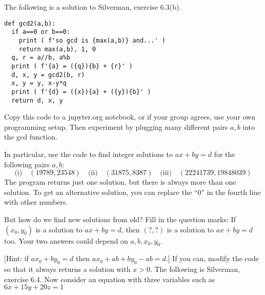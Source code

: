 \documentclass[12pt]{exam}
\begin{document}
\begin{questions}
  \question The following is a solution to Silverman, exercise 6.3(b).
  \begin{lstlisting}
def gcd2(a,b):
  if a==0 or b==0:
    print ( f'so gcd is {max(a,b)} and...' )
    return max(a,b), 1, 0
  q, r = a//b, a%b
  print ( f'{a} = ({q}){b} + {r}' )
  d, x, y = gcd2(b, r)
  x, y = y, x-y*q
  print ( f'{d} = ({x}){a} + ({y}){b}' )
  return d, x, y
  \end{lstlisting}
  Copy this code to a jupyter.org notebook, or if your group agrees, use your own programming setup. Then experiment by plugging many different pairs $a,b$ into the gcd function.

  In particular, use the code to find integer solutions to $ax+by=d$ for the following pairs $a,b$:
  \[\text{(i)}\quad(19789, 23548)\quad
  \text{(ii)}\quad(31875, 8387)\quad
  \text{(iii)}\quad(22241739, 19848039)
    \]
  \vspace{.75in}
  \question The program returns just one solution, but there is always more than one solution. To get an alternative solution, you can replace the ``$0$'' in the fourth line with other numbers.
  
   But how do we find new solutions from old? Fill in the question marks: If $(x_0,y_0)$ is a solution to $ax+by=d$, then $(?,?)$ is a solution to $ax+by=d$ too. Your two answers could depend on $a,b,x_0,y_0$.

  [Hint: if $ax_0+by_0=d$ then $ax_0+ab+by_0-ab=d$.]
  \vspace{\fill}
  \question If you can, modify the code so that it always returns a solution with $x>0$.
  \newpage
  \question The following is Silverman, exercise 6.4. Now consider an equation with three variables such as $6x+15y+20z=1$
\end{questions}
\end{document}
